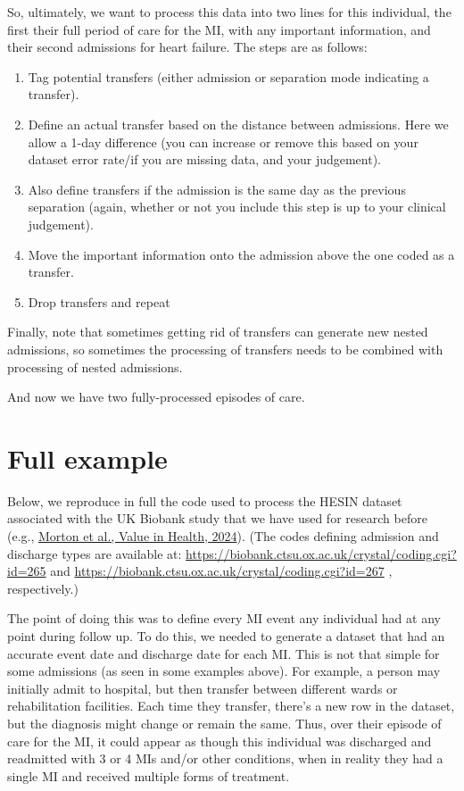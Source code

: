 \documentclass[11pt]{article}
\begin{document}
So, ultimately, we want to process this data into two lines for this individual, the first their full period
of care for the MI, with any important information, and their second admissions for heart failure. 
The steps are as follows:
\begin{enumerate}
\item Tag potential transfers (either admission or separation mode indicating a transfer).
\item Define an actual transfer based on the distance between admissions. Here we allow
a 1-day difference (you can increase or remove this based on your dataset error rate/if you are missing
data, and your judgement). 
\item Also define transfers if the admission is the same day as the previous separation
(again, whether or not you include this step is up to your clinical judgement).
\item Move the important information onto the admission above the one coded as a transfer.
\item Drop transfers and repeat
\end{enumerate}

Finally, note that sometimes getting rid of transfers can generate new nested admissions,
so sometimes the processing of transfers needs to be combined with processing of nested
admissions. 

\color{Blue4}
\begin{stlog}\end{stlog}
\color{black}

And now we have two fully-processed episodes of care. 

\clearpage
\section{Full example}
\label{P2}

Below, we reproduce in full the code used to process the HESIN dataset associated
with the UK Biobank study that we have used for research before (e.g., \color{blue}
\href{https://www.valueinhealthjournal.com/article/S1098-3015(24)02791-8/fulltext}{Morton et al., Value in Health, 2024}\color{black}). 
(The codes defining admission and discharge types are available at:
\color{blue} \url{https://biobank.ctsu.ox.ac.uk/crystal/coding.cgi?id=265} \color{black}
and
\color{blue} \url{https://biobank.ctsu.ox.ac.uk/crystal/coding.cgi?id=267} \color{black}
, respectively.)

The point of doing this was to define every MI event any individual
had at any point during follow up. To do this, we needed to generate a dataset
that had an accurate event date and discharge date for each MI. This is not 
that simple for some admissions (as seen in some examples above). 
For example, a person may initially admit to hospital, 
but then transfer between different wards or rehabilitation facilities. 
Each time they transfer, there's a new row in the dataset, but the diagnosis
might change or remain the same. Thus, 
over their episode of care for the MI, it could appear as though this individual was discharged 
and readmitted with 3 or 4 MIs and/or other conditions, when in reality they
had a single MI and received multiple forms of treatment. 
\end{document}
